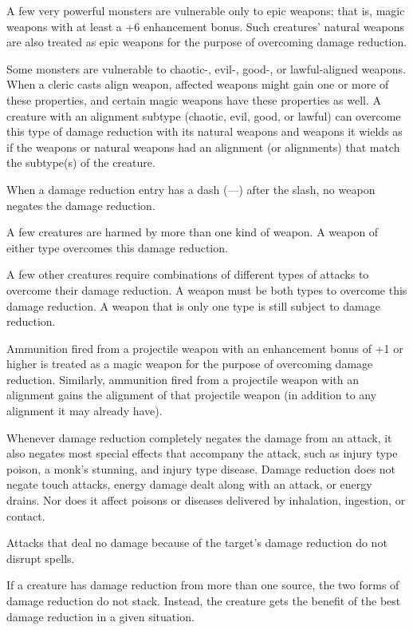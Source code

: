 A few very powerful monsters are vulnerable only to epic weapons; that is, magic weapons with at least a +6 enhancement bonus. Such creatures' natural weapons are also treated as epic weapons for the purpose of overcoming damage reduction.

Some monsters are vulnerable to chaotic-, evil-, good-, or lawful-aligned weapons. When a cleric casts align weapon, affected weapons might gain one or more of these properties, and certain magic weapons have these properties as well. A creature with an alignment subtype (chaotic, evil, good, or lawful) can overcome this type of damage reduction with its natural weapons and weapons it wields as if the weapons or natural weapons had an alignment (or alignments) that match the subtype(s) of the creature.

When a damage reduction entry has a dash (---) after the slash, no weapon negates the damage reduction.

A few creatures are harmed by more than one kind of weapon. A weapon of either type overcomes this damage reduction.

A few other creatures require combinations of different types of attacks to overcome their damage reduction. A weapon must be both types to overcome this damage reduction. A weapon that is only one type is still subject to damage reduction.

Ammunition fired from a projectile weapon with an enhancement bonus of +1 or higher is treated as a magic weapon for the purpose of overcoming damage reduction. Similarly, ammunition fired from a projectile weapon with an alignment gains the alignment of that projectile weapon (in addition to any alignment it may already have).

Whenever damage reduction completely negates the damage from an attack, it also negates most special effects that accompany the attack, such as injury type poison, a monk's stunning, and injury type disease. Damage reduction does not negate touch attacks, energy damage dealt along with an attack, or energy drains. Nor does it affect poisons or diseases delivered by inhalation, ingestion, or contact.

Attacks that deal no damage because of the target's damage reduction do not disrupt spells.

If a creature has damage reduction from more than one source, the two forms of damage reduction do not stack. Instead, the creature gets the benefit of the best damage reduction in a given situation.

